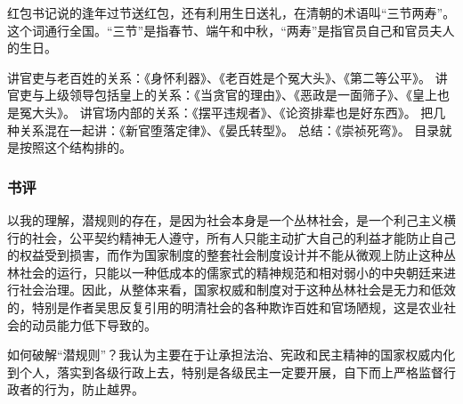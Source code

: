 红包书记说的逢年过节送红包，还有利用生日送礼，在清朝的术语叫“三节两寿”。这个词通行全国。“三节”是指春节、端午和中秋，“两寿”是指官员自己和官员夫人的生日。

讲官吏与老百姓的关系：《身怀利器》、《老百姓是个冤大头》、《第二等公平》。 讲官吏与上级领导包括皇上的关系：《当贪官的理由》、《恶政是一面筛子》、《皇上也是冤大头》。 讲官场内部的关系：《摆平违规者》、《论资排辈也是好东西》。 把几种关系混在一起讲：《新官堕落定律》、《晏氏转型》。 总结：《崇祯死弯》。 目录就是按照这个结构排的。

\subsubsection{书评}
以我的理解，潜规则的存在，是因为社会本身是一个丛林社会，是一个利己主义横行的社会，公平契约精神无人遵守，所有人只能主动扩大自己的利益才能防止自己的权益受到损害，而作为国家制度的整套社会制度设计并不能从微观上防止这种丛林社会的运行，只能以一种低成本的儒家式的精神规范和相对弱小的中央朝廷来进行社会治理。因此，从整体来看，国家权威和制度对于这种丛林社会是无力和低效的，特别是作者吴思反复引用的明清社会的各种欺诈百姓和官场陋规，这是农业社会的动员能力低下导致的。

如何破解“潜规则”？我认为主要在于让承担法治、宪政和民主精神的国家权威内化到个人，落实到各级行政上去，特别是各级民主一定要开展，自下而上严格监督行政者的行为，防止越界。